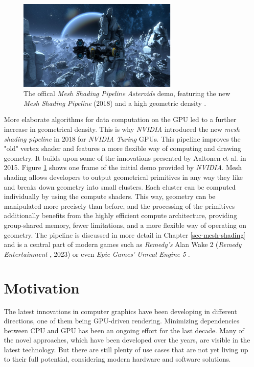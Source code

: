 \begin{figure}[h]
    \centering
    \includegraphics[width=300px]{images/graphics/mesh-shading-asteroids-demo.jpg}
    \caption{The offical \emph{Mesh Shading Pipeline} \emph{Asteroids} demo, featuring the new \emph{Mesh Shading Pipeline} (2018)
    and a high geometric density \cite{Kraemer2018}.}
    \label{fig:mesh-shading-asteroids-demo}
\end{figure}

\noindent
More elaborate algorithms for data computation on the \ac{GPU} led to a further increase in geometrical density.
This is why \emph{NVIDIA} introduced the new \emph{mesh shading pipeline} in 2018 for \emph{NVIDIA Turing} \ac{GPU}s.
This pipeline improves the "old" vertex shader and features a more flexible way of computing and drawing geometry. 
It builds upon some of the innovations presented by Aaltonen et al.  \cite{Aaltonen2015} in 2015. Figure 
\ref{fig:mesh-shading-asteroids-demo} shows one frame of the initial demo provided by \emph{NVIDIA}. Mesh shading 
allows developers to output geometrical primitives in any way they like and breaks down geometry into small clusters.
Each cluster can be computed individually by using the compute shaders. This way, geometry can be manipulated more 
precisely than before, and the processing of the primitives additionally benefits from the highly efficient compute 
architecture, providing group-shared memory, fewer limitations, and a more flexible way of operating on geometry.
The pipeline is discussed in more detail in Chapter \ref{sec-mesh-shading} and is a central part of modern games 
such as \emph{Remedy's} Alan Wake 2 (\emph{Remedy Entertainment} \cite{AlanWake22023}, 2023) or even 
\emph{Epic Games'} \emph{Unreal Engine 5} \cite{Karis2021}. 


\section{Motivation} \label{sec-motivation}

The latest innovations in computer graphics have been developing in different directions,
one of them being \ac{GPU}-driven rendering. Minimizing dependencies between \ac{CPU} and \ac{GPU} 
has been an ongoing effort for the last decade. Many of the novel approaches, which have been developed 
over the years, are visible in the latest technology. But there are still plenty of use cases that are 
not yet living up to their full potential, considering modern hardware and software solutions.\\

